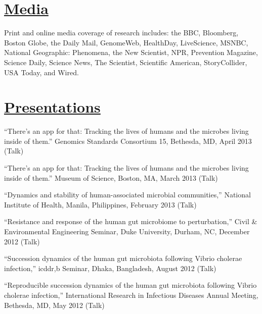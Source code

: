 \documentclass[overlapped,line,11pt]{res}
\begin{document}
\begin{resume}
\section{\underline{\sc Media}} 
\vspace{.25in} Print and online media coverage of research includes:
the BBC, Bloomberg, Boston Globe, the Daily Mail, GenomeWeb,
HealthDay, LiveScience, MSNBC, National Geographic: Phenomena, the New
Scientist, NPR, Prevention Magazine, Science Daily, Science News, The
Scientist, Scientific American, StoryCollider, USA Today, and Wired.

\section{\underline{\sc Presentations}}
\vspace{.25in}

\begin{revnumerate}[19]

\item {``There's an app for that: Tracking the lives of humans and the
  microbes living inside of them.'' Genomics Standards Consortium 15,
  Bethesda, MD, April 2013 (Talk)}
\vspace*{1mm}

\item {``There's an app for that: Tracking the lives of humans and
  the microbes living inside of them.'' Museum of Science, Boston,
  MA, March 2013 (Talk)}
\vspace*{1mm}

\item {``Dynamics and stability of human-associated microbial
  communities,'' National Institute of Health, Manila,
  Philippines, February 2013 (Talk)}
\vspace*{1mm}

\item {``Resistance and response of the human gut microbiome to
  perturbation,'' Civil \& Environmental Engineering Seminar, Duke University,
  Durham, NC, December 2012 (Talk)}

\item {``Succession dynamics of the human gut microbiota
  following Vibrio cholerae infection,'' icddr,b Seminar, Dhaka,
  Bangladesh, August 2012 (Talk)}
\vspace*{1mm}

\item {``Reproducible succession dynamics of the human gut microbiota
  following Vibrio cholerae infection,'' International Research in
  Infectious Diseases Annual Meeting, Bethesda, MD, May 2012 (Talk)}
\vspace*{1mm}


\end{revnumerate}
\end{resume}
\end{document}
